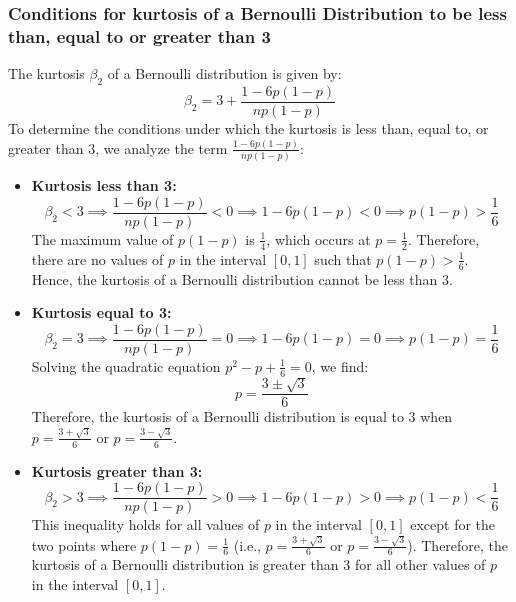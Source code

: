 \documentclass[openany]{book}
\begin{document}
\subsubsection{Conditions for kurtosis of a Bernoulli Distribution to be less than, equal to or greater than 3}
The kurtosis $\beta_2$ of a Bernoulli distribution is given by:
$$\beta_2 = 3 + \frac{1 - 6p(1-p)}{np(1-p)}$$
To determine the conditions under which the kurtosis is less than, equal to, or greater than 3, we analyze the term $\frac{1 - 6p(1-p)}{np(1-p)}$:
\begin{itemize}
    \item \textbf{Kurtosis less than 3:} 
    $$\beta_2 < 3 \implies \frac{1 - 6p(1-p)}{np(1-p)} < 0 \implies 1 - 6p(1-p) < 0 \implies p(1-p) > \frac{1}{6}$$
    The maximum value of $p(1-p)$ is $\frac{1}{4}$, which occurs at $p = \frac{1}{2}$. Therefore, there are no values of $p$ in the interval $[0, 1]$ such that $p(1-p) > \frac{1}{6}$. Hence, the kurtosis of a Bernoulli distribution cannot be less than 3.
    
    \item \textbf{Kurtosis equal to 3:} 
    $$\beta_2 = 3 \implies \frac{1 - 6p(1-p)}{np(1-p)} = 0 \implies 1 - 6p(1-p) = 0 \implies p(1-p) = \frac{1}{6}$$
    Solving the quadratic equation $p^2 - p + \frac{1}{6} = 0$, we find:
    $$p = \frac{3 \pm \sqrt{3}}{6}$$
    Therefore, the kurtosis of a Bernoulli distribution is equal to 3 when $p = \frac{3 + \sqrt{3}}{6}$ or $p = \frac{3 - \sqrt{3}}{6}$.
    
    \item \textbf{Kurtosis greater than 3:} 
    $$\beta_2 > 3 \implies \frac{1 - 6p(1-p)}{np(1-p)} > 0 \implies 1 - 6p(1-p) > 0 \implies p(1-p) < \frac{1}{6}$$
    This inequality holds for all values of $p$ in the interval $[0, 1]$ except for the two points where $p(1-p) = \frac{1}{6}$ (i.e., $p = \frac{3 + \sqrt{3}}{6}$ or $p = \frac{3 - \sqrt{3}}{6}$). Therefore, the kurtosis of a Bernoulli distribution is greater than 3 for all other values of $p$ in the interval $[0, 1]$.
\end{itemize}
\end{document}
